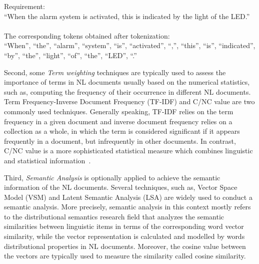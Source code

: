 \documentclass[graybox]{svmult}
\begin{document}
\vspace{2mm}
\begin{mdframed}[style=mystyle]
\noindent Requirement: \\
``When the alarm system is activated, this is indicated by the light of the LED.''\\ \\
\noindent The corresponding tokens obtained after tokenization: \\
``When'', ``the'', ``alarm'', ``system'', ``is'', ``activated'', ``,'', ``this'', ``is'', ``indicated'', ``by'', ``the'', ``light'', ``of'', ``the'', ``LED'', ``.''
\end{mdframed}
\vspace{4mm}


Second, some \textit{Term weighting} techniques are typically used to assess the importance of terms in NL documents usually based on the numerical statistics, such as, computing the frequency of their occurrence in different NL documents. Term Frequency-Inverse Document Frequency (TF-IDF) and C/NC value are two commonly used techniques. 
Generally speaking, TF-IDF relies on the term frequency in a given document and inverse document frequency relies on a collection as a whole, in which the term is considered significant if it appears frequently in a document, but infrequently in other documents. In contrast, C/NC value is a more sophisticated statistical measure which combines linguistic and statistical information~\cite{FrantziAM00}. 

Third, \textit{Semantic Analysis} is optionally applied to achieve the semantic information of the NL documents. Several techniques, such as, Vector Space Model (VSM) and Latent Semantic Analysis (LSA) are widely used to conduct a semantic analysis. More precisely, semantic analysis in this context mostly refers to the distributional semantics research field that analyzes the semantic similarities between linguistic items in terms of the corresponding word vector similarity, while the vector representation is calculated and modelled by words distributional properties in NL documents. Moreover, the cosine value between the vectors are typically used to measure the similarity called cosine similarity.
\end{document}
